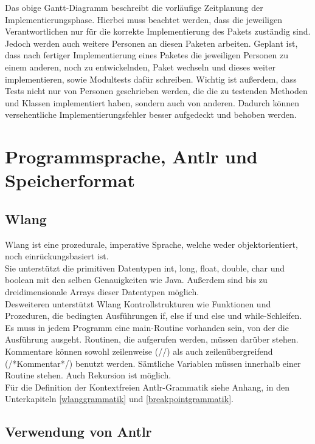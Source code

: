 \documentclass[parskip=full]{scrartcl}
\begin{document}
Das obige Gantt-Diagramm beschreibt die vorläufige Zeitplanung der Implementierungsphase. 
Hierbei muss beachtet werden, dass die jeweiligen Verantwortlichen nur für die korrekte Implementierung des Pakets zuständig sind. 
Jedoch werden auch weitere Personen an diesen Paketen arbeiten.
Geplant ist, dass nach fertiger Implementierung eines Paketes die jeweiligen Personen zu einem anderen, noch zu entwickelnden, Paket wechseln und dieses weiter implementieren, sowie Modultests dafür schreiben. 
Wichtig ist außerdem, dass Tests nicht nur von Personen geschrieben werden, die die zu testenden Methoden und Klassen implementiert haben, sondern auch von anderen. 
Dadurch können versehentliche Implementierungsfehler besser aufgedeckt und behoben werden.

\section{Programmsprache, Antlr und Speicherformat}\label{FormSpez}

\subsection{Wlang}

Wlang ist eine prozedurale, imperative Sprache, welche weder objektorientiert, noch einrückungsbasiert ist. \\
Sie unterstützt die primitiven Datentypen int, long, float, double, char und boolean mit den selben Genauigkeiten wie Java.
Außerdem sind  bis zu dreidimensionale Arrays dieser Datentypen möglich. \\
Desweiteren unterstützt Wlang Kontrollstrukturen wie Funktionen und Prozeduren, die bedingten Ausführungen if, else if und else und while-Schleifen. \\
Es muss in jedem Programm eine main-Routine vorhanden sein, von der die Ausführung ausgeht. 
Routinen, die aufgerufen werden, müssen darüber stehen. 
Kommentare können sowohl zeilenweise (//) als auch zeilenübergreifend (/*Kommentar*/) benutzt werden.
Sämtliche Variablen müssen innerhalb einer Routine stehen. 
Auch Rekursion ist möglich. \\
Für die Definition der Kontextfreien Antlr-Grammatik siehe Anhang, in den Unterkapiteln \ref{wlanggrammatik} und \ref{breakpointgrammatik}.

\subsection{Verwendung von Antlr}
\end{document}
